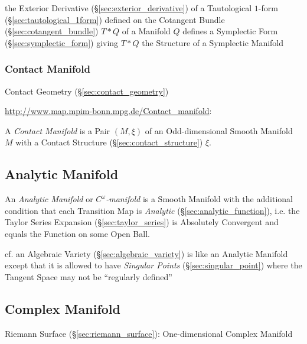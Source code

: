 the Exterior Derivative (\S\ref{sec:exterior_derivative}) of a Tautological
$1$-form (\S\ref{sec:tautological_1form}) defined on the Cotangent Bundle
(\S\ref{sec:cotangent_bundle}) $T *
Q$ of a Manifold $Q$ defines a Symplectic Form (\S\ref{sec:symplectic_form})
giving $T * Q$ the Structure of a Symplectic Manifold



\subsubsection{Contact Manifold}\label{sec:contact_manifold}

\fist Contact Geometry (\S\ref{sec:contact_geometry})

\url{http://www.map.mpim-bonn.mpg.de/Contact_manifold}:

A \emph{Contact Manifold} is a Pair $(M,\xi)$ of an Odd-dimensional Smooth
Manifold $M$ with a Contact Structure (\S\ref{sec:contact_structure}) $\xi$.



\subsection{Analytic Manifold}\label{sec:analytic_manifold}

An \emph{Analytic Manifold} or \emph{$C^\omega$-manifold} is a Smooth Manifold
with the additional condition that each Transition Map is \emph{Analytic}
(\S\ref{sec:analytic_function}), i.e. the Taylor Series Expansion
(\S\ref{sec:taylor_series}) is Absolutely Convergent and equals the Function on
some Open Ball.

cf. an Algebraic Variety (\S\ref{sec:algebraic_variety}) is like an Analytic
Manifold except that it is allowed to have \emph{Singular Points}
(\S\ref{sec:singular_point}) where the Tangent Space may not be ``regularly
defined''



\subsection{Complex Manifold}\label{sec:complex_manifold}

Riemann Surface (\S\ref{sec:riemann_surface}): One-dimensional Complex
Manifold

